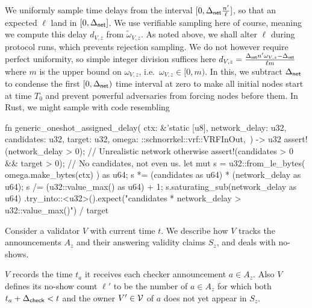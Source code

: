 We uniformly sample time delays from the interval $[0,\Delta_{\mathsf{net}} {n' \over \ell}]$, so that an expected $\ell$ land in $[0,\Delta_{\mathsf{net}}]$.  We use verifiable sampling here of course, meaning we compute this delay $d_{V,z}$ from $\tilde{\omega}_{V,z}$.  
%
As noted above, we shall alter $\ell$ during protocol runs, which prevents rejection sampling.  We do not however require perfect uniformity, so simple integer division suffices here $d_{V,z} = {\Delta_{\mathsf{net}} n' \omega_{V,z} - \Delta_{\mathsf{net}} \over \ell m}$ where $m$ is the upper bound on $\omega_{V,z}$, i.e.\ $\omega_{V,z} \in [0,m)$.  
%
In this, we subtract $\Delta_{\mathsf{net}}$ to condense the first $[0,\Delta_{\mathsf{net}})$ time interval at zero to make all initial nodes start at time $T_0$ and prevent powerful adversaries from forcing nodes before them. 
%
In Rust, we might sample with code resembling
\begin{code}
fn generic_oneshot_assigned_delay(
    ctx: &'static [u8],
    network_delay: u32, 
    candidates: u32,
    target: u32,
    omega: ::schnorrkel::vrf::VRFInOut,\
) -> u32 {
    assert!(network_delay > 0); // Unrealistic network otherwise
    assert!(candidates > 0 && target > 0); // No candidates, not even us.
    let mut s = u32::from_le_bytes( omega.make_bytes(ctx) ) as u64;
    s *= (candidates as u64) * (network_delay as u64);
    s /= (u32::value_max() as u64) + 1;
    s.saturating_sub(network_delay as u64)
    .try_into::<u32>().expect("candidates * network_delay > u32::value_max()")
    / target
}
\end{code}

Consider a validator $V$ with current time $t$.  We describe how $V$ tracks the announcements $A_z$ and their answering validity claims $S_z$, and deals with no-shows.

$V$ records the time $t_a$ it receives each checker announcement $a \in A_z$.  Also $V$ defines its no-show count $\ell'$ to be the number of $a \in A_z$ for which both $t_a + \Delta_{\mathsf{check}} < t$ and the owner $V'\in \mathcal{V}$ of $a$ does not yet appear in $S_z$.

